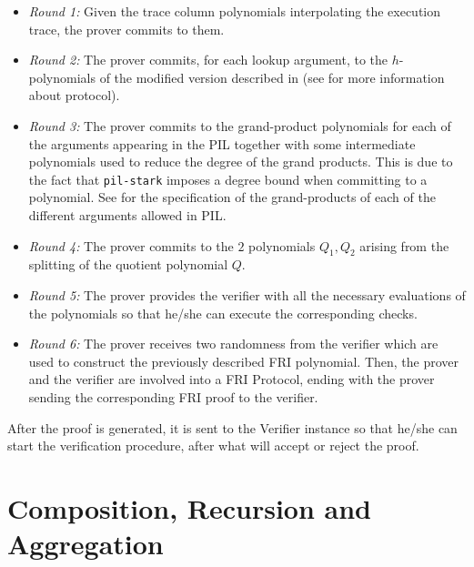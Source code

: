 \begin{itemize}

\item \textit{Round 1:} Given the trace column polynomials interpolating the execution trace, the prover commits to them.

\item \textit{Round 2:} The prover commits, for each lookup argument, to the $h$-polynomials of the modified \plookup version described in \cite{EPRINT:PFMBM22} (see \cite{EPRINT:GabWil20} for more information about \plookup protocol).

\item \textit{Round 3:} The prover commits to the grand-product polynomials for each of the arguments appearing in the PIL together with some intermediate polynomials used to reduce the degree of the grand products. This is due to the fact that \texttt{pil-stark} imposes a degree bound when committing to a polynomial. See \cite{EPRINT:GabWilCio19, EPRINT:GabWil20} for the specification of the grand-products of each of the different arguments allowed in PIL.

\item \textit{Round 4:} The prover commits to the $2$ polynomials $Q_1, Q_2$ arising from the splitting of the quotient polynomial $Q$. 

\item \textit{Round 5:} The prover provides the verifier with all the necessary evaluations of the polynomials so that he/she can execute the corresponding checks. 

\item \textit{Round 6:} The prover receives two randomness from the verifier which are used to construct the previously described FRI polynomial. Then, the prover and the verifier are involved into a FRI Protocol, ending with the prover sending the corresponding FRI proof to the verifier. 

\end{itemize} 


After the proof is generated, it is sent to the Verifier instance so that he/she can start the verification procedure, after what will accept or reject the proof. 



\section{Composition, Recursion and Aggregation}

